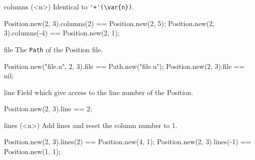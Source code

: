 \begin{urbiscriptapi}
\item[columns](<n>)%
  Identical to \lstinline|'+'(\var{n})|.
\begin{urbiassert}
Position.new(2, 3).columns(2) == Position.new(2, 5);
Position.new(2, 3).columns(-4) == Position.new(2, 1);
\end{urbiassert}

\item[file]
  The \lstinline|Path| of the Position file.
\begin{urbiassert}
Position.new("file.u", 2, 3).file == Path.new("file.u");
Position.new(2, 3).file == nil;
\end{urbiassert}

\item[line]
  Field which give access to the line number of the Position.
\begin{urbiassert}
Position.new(2, 3).line == 2;
\end{urbiassert}

\item[lines](<n>)%
  Add  lines and reset the column number to 1.
\begin{urbiassert}
Position.new(2, 3).lines(2) == Position.new(4, 1);
Position.new(2, 3).lines(-1) == Position.new(1, 1);
\end{urbiassert}

\end{urbiscriptapi}


